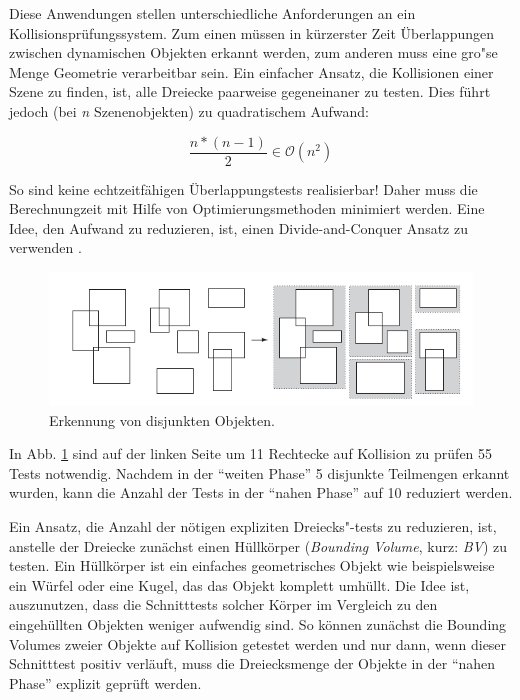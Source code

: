 Diese Anwendungen stellen unterschiedliche Anforderungen an ein
Kollisionspr\"ufungssystem. Zum einen m\"ussen in k\"urzerster Zeit \"Uberlappungen
zwischen dynamischen Objekten erkannt werden, zum anderen muss eine
gro"se Menge Geometrie verarbeitbar sein. Ein einfacher Ansatz, die Kollisionen
einer Szene zu finden, ist, alle Dreiecke paarweise gegeneinaner
zu testen. Dies f\"uhrt jedoch (bei  {\em n}
Szenenobjekten) zu quadratischem Aufwand:

\begin{equation}
\frac{n*(n-1)}{2} \in \mathcal O(n^2)\label{quad}
\end{equation}

So sind keine echtzeitf\"ahigen \"Uberlappungstests realisierbar! Daher muss die
Berechnungzeit mit Hilfe von Optimierungsmethoden minimiert werden. Eine Idee,
den Aufwand zu reduzieren, ist, einen Divide-and-Conquer Ansatz zu verwenden \cite{Ericson05}. 


\begin{figure}[H]
\centerline{
	\includegraphics[width=0.7\columnwidth]{graphics/box.png}
}
\caption{Erkennung von disjunkten Objekten.}
\label{broadbox}
\end{figure}

In Abb. \ref{broadbox} sind auf der linken Seite um 11 Rechtecke auf Kollision zu pr\"ufen 55 Tests notwendig.
Nachdem in der "`weiten Phase"' 5 disjunkte Teilmengen erkannt wurden, kann die Anzahl der Tests in der "`nahen Phase"' auf 10 reduziert werden.

Ein Ansatz, die Anzahl der n\"otigen expliziten Dreiecks"-tests zu reduzieren, ist, anstelle der Dreiecke zun\"achst einen H\"ullk\"orper ({\em Bounding Volume}, kurz: {\em BV}) zu testen. Ein  H\"ullk\"orper ist ein
einfaches geometrisches Objekt wie beispielsweise ein W\"urfel oder eine Kugel, das das Objekt komplett
umh\"ullt. Die Idee ist, auszunutzen, dass die Schnitttests solcher K\"orper im Vergleich zu den eingeh\"ullten Objekten weniger aufwendig sind. So k\"onnen zun\"achst die Bounding Volumes zweier Objekte auf Kollision
getest\-et werden und nur dann, wenn dieser Schnitttest positiv verl\"auft, muss
die Dreiecksmenge der Objekte in der "`nahen Phase"' explizit gepr\"uft werden.

